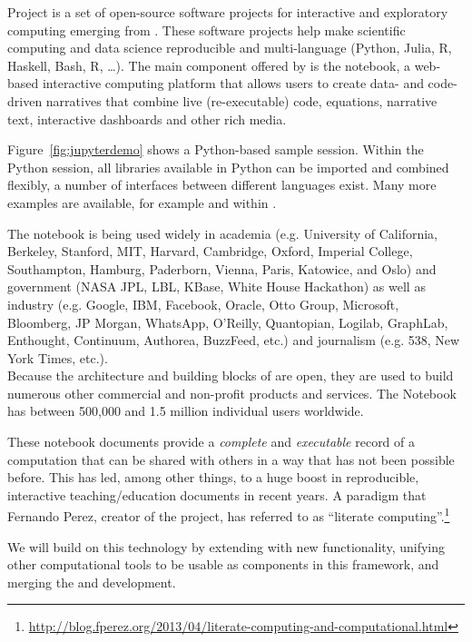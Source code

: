 Project \Jupyter \cite{Jupyter} is a set of open-source software projects for
interactive and exploratory computing emerging from \IPython \cite{IPython}. These
software projects help make scientific computing and data science
reproducible and multi-language (Python, Julia, R, Haskell, Bash, R,
\ldots). The main component offered by \Jupyter is the \Jupyter
notebook, a web-based interactive computing platform that allows users
to create data- and code-driven narratives that combine live
(re-executable) code, equations, narrative text, interactive
dashboards and other rich media.

Figure~\ref{fig:jupyterdemo} shows a Python-based sample
session. Within the Python session, all libraries available in Python
can be imported and combined flexibly, a number of interfaces between
different languages exist. Many more examples are available, for
example \cite{IPython-demo-hyperbolic-conservation-laws} and
within \cite{IPython-sload-foundation-report-2013}.

The \Jupyter notebook is being used widely in academia
(e.g. University of California, Berkeley, Stanford,
MIT, Harvard, Cambridge, Oxford, Imperial College, Southampton,
Hamburg, Paderborn, Vienna, Paris, Katowice, and Oslo) and government
(NASA JPL, LBL, KBase, White House Hackathon) as well as
industry (e.g. Google, IBM, Facebook, Oracle, Otto Group, Microsoft,
Bloomberg, JP Morgan, WhatsApp, O’Reilly, Quantopian, Logilab,
GraphLab, Enthought, Continuum, Authorea, BuzzFeed, etc.)  and
journalism (e.g. 538, New York Times, etc.). \\
%
Because the architecture and building blocks of \Jupyter are open,
they are used to build numerous other commercial and non-profit
products and services. The \Jupyter Notebook has between 500,000 and
1.5 million individual users worldwide.

These notebook documents provide a \emph{complete} and
\emph{executable} record of a computation that can be shared with
others in a way that has not been possible before. This has led, among
other things, to a huge boost in reproducible, interactive
teaching/education documents in recent years. A paradigm that Fernando Perez, creator of the project, has referred to as ``literate computing''.\footnote{\url{http://blog.fperez.org/2013/04/literate-computing-and-computational.html}}

We will build on this technology by extending \Jupyter with new
functionality, unifying other computational tools to be usable as
components in this framework, and merging the \Sage and \Jupyter
development.  



